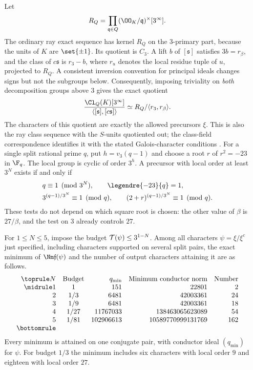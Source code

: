 Let
\[
 R_Q=\prod_{\mathfrak q\in Q}(\OO_K/\mathfrak q)^\times[3^\infty].
\]
The ordinary ray exact sequence has kernel $R_Q$ on the $3$-primary part,
because the units of $K$ are $\set{\pm1}$. Its quotient is $C_3$. A lift $b$
of $[\mathfrak s]$ satisfies $3b=r_\beta$, and the class of $c\mathfrak s$
is $r_3-b$, where $r_u$ denotes the local residue tuple of $u$, projected to
$R_Q$. A consistent inversion convention for principal ideals changes signs
but not the subgroups below. Consequently, imposing triviality on \emph{both}
decomposition groups above $3$ gives the exact quotient
\begin{equation}\label{spn:eq:source-twist-quotient}
 \frac{\Cl_Q(K)[3^\infty]}{\langle[\mathfrak s],[c\mathfrak s]\rangle}
 \simeq R_Q/\langle r_3,r_\beta\rangle .
\end{equation}
The characters of this quotient are exactly the allowed precursors $\xi$.
This is also the ray class sequence with the $S$-units quotiented out; the
class-field correspondence identifies it with the stated Galois-character
conditions \cite{Milne2020CFT}. For a single split rational prime $q$, put
$h=v_3(q-1)$ and choose a root $r$ of $r^2=-23$ in $\F_q$. The local group is
cyclic of order $3^h$. A precursor with local order at least $3^N$ exists if
and only if
\begin{equation}\label{spn:eq:residue-tests}
\begin{split}
 &q\equiv1\pmod{3^N},\qquad\legendre{-23}{q}=1,\\
 &3^{(q-1)/3^N}\equiv1\pmod q,\qquad(2+r)^{(q-1)/3^N}\equiv1\pmod q .
\end{split}
\end{equation}
These tests do not depend on which square root is chosen: the other value of
$\beta$ is $27/\beta$, and the test on $3$ already controls $27$.

\begin{theorem}\label{spn:thm:source-twist-minimum}
For $1\le N\le5$, impose the budget $\mathcal{T}(\psi)\le3^{1-N}$. Among all
characters $\psi=\xi/\xi^c$ just specified, including characters supported
on several split pairs, the exact minimum of $\Nm\mathfrak f(\psi)$ and the
number of output characters attaining it are as follows.
\[
\begin{array}{rcrrr}
\toprule
N & \text{Budget} & q_{\min} & \text{Minimum conductor norm} & \text{Number}\\
\midrule
1 & 1    & 151       & 22801             & 2\\
2 & 1/3  & 6481      & 42003361          & 24\\
3 & 1/9  & 6481      & 42003361          & 18\\
4 & 1/27 & 11767033  & 138463065623089   & 54\\
5 & 1/81 & 102906613 & 10589770999131769 & 162\\
\bottomrule
\end{array}
\]
Every minimum is attained on one conjugate pair, with conductor ideal
$(q_{\min})$ for $\psi$. For budget $1/3$ the minimum includes six
characters with local order $9$ and eighteen with local order $27$.
\end{theorem}

